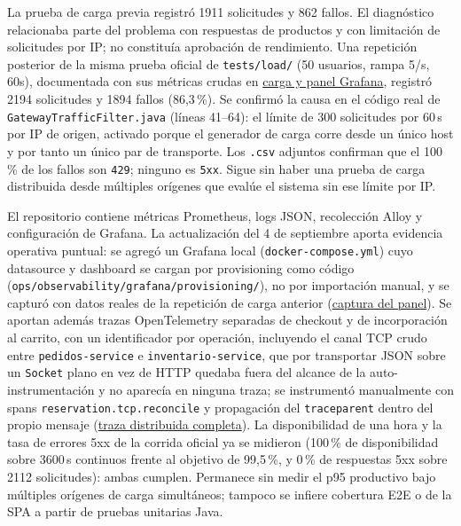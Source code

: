 \documentclass[12pt,a4paper]{article}
\begin{document}
La prueba de carga previa registró 1911 solicitudes y 862 fallos. El diagnóstico relacionaba parte del problema con respuestas de productos y con limitación de solicitudes por IP; no constituía aprobación de rendimiento. Una repetición posterior de la misma prueba oficial de \texttt{tests/load/} (50 usuarios, rampa 5/s, 60s), documentada con sus métricas crudas en \href{https://github.com/JoseLozanoMorales/TiendaTech/blob/b690470163513c757dd51cb8d47677d09955fda8/docs/evidencias/paso10-item5-grafana-carga.md}{carga y panel Grafana}, registró 2194 solicitudes y 1894 fallos (86,3\,\%). Se confirmó la causa en el código real de \texttt{GatewayTrafficFilter.java} (líneas 41--64): el límite de 300 solicitudes por 60\,s por IP de origen, activado porque el generador de carga corre desde un único host y por tanto un único par de transporte. Los \texttt{.csv} adjuntos confirman que el 100\,\% de los fallos son \texttt{429}; ninguno es \texttt{5xx}. Sigue sin haber una prueba de carga distribuida desde múltiples orígenes que evalúe el sistema sin ese límite por IP.

El repositorio contiene métricas Prometheus, logs JSON, recolección Alloy y configuración de Grafana. La actualización del 4 de septiembre aporta evidencia operativa puntual: se agregó un Grafana local (\texttt{docker-compose.yml}) cuyo datasource y dashboard se cargan por provisioning como código (\texttt{ops/observability/grafana/provisioning/}), no por importación manual, y se capturó con datos reales de la repetición de carga anterior (\href{https://github.com/JoseLozanoMorales/TiendaTech/blob/b690470163513c757dd51cb8d47677d09955fda8/docs/evidencias/paso10-item5-grafana-carga.md}{captura del panel}). Se aportan además trazas OpenTelemetry separadas de checkout y de incorporación al carrito, con un identificador por operación, incluyendo el canal TCP crudo entre \texttt{pedidos-service} e \texttt{inventario-service}, que por transportar JSON sobre un \texttt{Socket} plano en vez de HTTP quedaba fuera del alcance de la auto-instrumentación y no aparecía en ninguna traza; se instrumentó manualmente con spans \texttt{reservation.tcp.reconcile} y propagación del \texttt{traceparent} dentro del propio mensaje (\href{https://github.com/JoseLozanoMorales/TiendaTech/blob/b690470163513c757dd51cb8d47677d09955fda8/docs/evidencias/paso10-item6-trace-distribuida.md}{traza distribuida completa}). La disponibilidad de una hora y la tasa de errores 5xx de la corrida oficial ya se midieron (100\,\% de disponibilidad sobre 3600\,s continuos frente al objetivo de 99,5\,\%, y 0\,\% de respuestas 5xx sobre 2112 solicitudes): ambas cumplen. Permanece sin medir el p95 productivo bajo múltiples orígenes de carga simultáneos; tampoco se infiere cobertura E2E o de la SPA a partir de pruebas unitarias Java.
\end{document}
